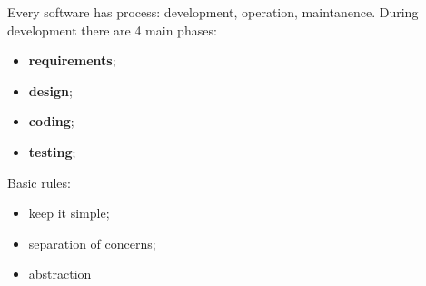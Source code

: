 \documentclass[12pt]{article}
\begin{document}
Every software has process: development, operation, maintanence. During development there are 4 main phases:
\begin{itemize}
    \item \textbf{requirements};
    \item \textbf{design};
    \item \textbf{coding};
    \item \textbf{testing};
\end{itemize}

Basic rules:
\begin{itemize}
    \item keep it simple;
    \item separation of concerns;
    \item abstraction
\end{itemize}
\end{document}
